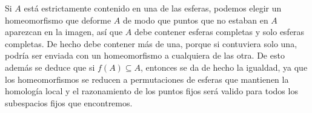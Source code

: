 \documentclass[twoside]{article}
\begin{document}
\begin{solucion}

Si $A$ está estrictamente contenido en una de las esferas, podemos elegir un homeomorfismo que deforme $A$ de modo que puntos que no estaban en $A$ aparezcan en la imagen, así que $A$ debe contener esferas completas y solo esferas completas. De hecho debe contener más de una, porque si contuviera solo una, podría ser enviada con un homeomorfismo a cualquiera de las otra. De esto además se deduce que si $f(A)\subseteq A$, entonces se da de hecho la igualdad, ya que los homeomorfismos se reducen a permutaciones de esferas que mantienen la homología local y el razonamiento de los puntos fijos será valido para todos los subespacios fijos que encontremos.


\end{solucion}
\end{document}
